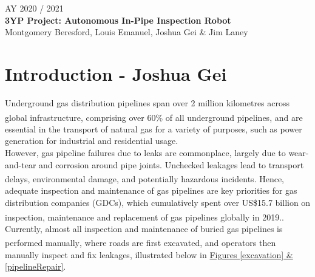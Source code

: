 \documentclass[11pt]{article}		%
\newcommand{\supercite}[1]{\textsuperscript{\cite{#1}}}		%
\begin{document}
	
	\flushleft
	\raggedright

	\begin{center}
		\vspace*{2cm}
		AY 2020 / 2021\\ %
		\vspace*{6cm}
		\huge{\textbf{3YP Project: Autonomous In-Pipe Inspection Robot}}\\ 
		\vspace*{6cm}
		\large{Montgomery Beresford, Louis Emanuel, Joshua Gei \& Jim Laney}
		\thispagestyle{empty} %
	\end{center}

	\newpage
	
	\pagestyle{empty}
	\tableofcontents
	
	\newpage
    \pagestyle{plain}
	\setcounter{page}{1}
	
	\section[Introduction]{Introduction - Joshua Gei}
	
		Underground gas distribution pipelines span over 2 million kilometres across global infrastructure, comprising over 60\% of all underground pipelines\supercite{sönnichsen_5_2021}, and are essential in the transport of natural gas for a variety of purposes, such as power generation for industrial and residential usage. \\ \hspace*{3ex}
		However, gas pipeline failures due to leaks are commonplace, largely due to wear-and-tear and corrosion around pipe joints. Unchecked leakages lead to transport delays, environmental damage, and potentially hazardous incidents\supercite{ltd}. Hence, adequate inspection and maintenance of gas pipelines are key priorities for gas distribution companies (GDCs), which cumulatively spent over US\$15.7 billion on inspection, maintenance  and replacement of gas pipelines globally in 2019.\supercite{ltd}. \\ \hspace*{3ex}
		Currently, almost all inspection and maintenance of buried gas pipelines is performed manually\supercite{sönnichsen_5_2021}, where roads are first excavated, and operators then manually inspect and fix leakages, illustrated below in \hyperref[excavation]{Figures \ref*{excavation} \& \ref*{pipelineRepair}}.
\end{document}
